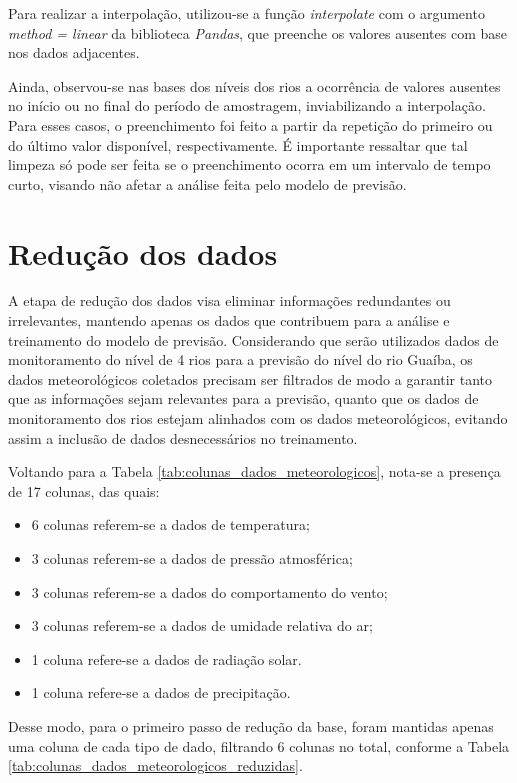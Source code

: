 Para realizar a interpolação, utilizou-se a função \textit{interpolate} com o argumento \textit{method = linear} da biblioteca \textit{Pandas}, que preenche os valores ausentes com base nos dados adjacentes.

Ainda, observou-se nas bases dos níveis dos rios a ocorrência de valores ausentes no início ou no final do período de amostragem, inviabilizando a interpolação. Para esses casos, o preenchimento foi feito a partir da repetição do primeiro ou do último valor disponível, respectivamente. É importante ressaltar que tal limpeza só pode ser feita se o preenchimento ocorra em um intervalo de tempo curto, visando não afetar a análise feita pelo modelo de previsão.

\section{Redução dos dados}

A etapa de redução dos dados visa eliminar informações redundantes ou irrelevantes, mantendo apenas os dados que contribuem para a análise e treinamento do modelo de previsão. Considerando que serão utilizados dados de monitoramento do nível de 4 rios para a previsão do nível do rio Guaíba, os dados meteorológicos coletados precisam ser filtrados de modo a garantir tanto que as informações sejam relevantes para a previsão, quanto que os dados de monitoramento dos rios estejam alinhados com os dados meteorológicos, evitando assim a inclusão de dados desnecessários no treinamento. 

Voltando para a Tabela \ref{tab:colunas_dados_meteorologicos}, nota-se a presença de 17 colunas, das quais:

\begin{itemize}
	\item 6 colunas referem-se a dados de temperatura;
	\item 3 colunas referem-se a dados de pressão atmosférica;
	\item 3 colunas referem-se a dados do comportamento do vento;
	\item 3 colunas referem-se a dados de umidade relativa do ar;
	\item 1 coluna refere-se a dados de radiação solar.
	\item 1 coluna refere-se a dados de precipitação.
\end{itemize}

Desse modo, para o primeiro passo de redução da base, foram mantidas apenas uma coluna de cada tipo de dado, filtrando 6 colunas no total, conforme a Tabela \ref{tab:colunas_dados_meteorologicos_reduzidas}. 

